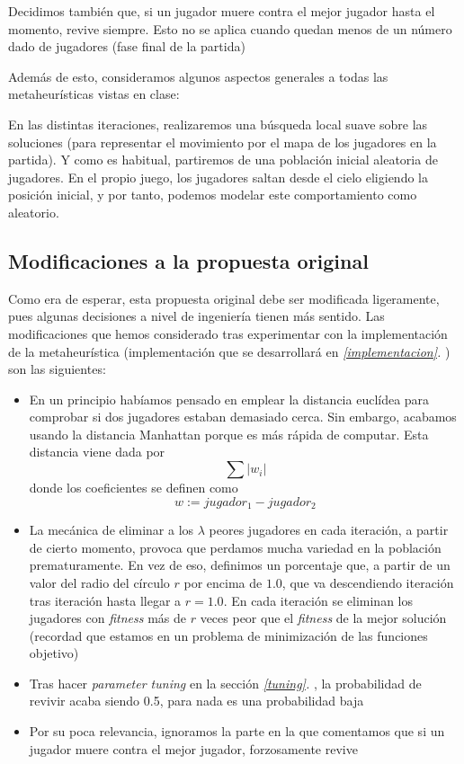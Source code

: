 \documentclass[11pt]{article}
\begin{document}
Decidimos también que, si un jugador muere contra el mejor jugador hasta el momento, revive siempre. Esto no se aplica cuando quedan menos de un número dado de jugadores (fase final de la partida)

Además de esto, consideramos algunos aspectos generales a todas las metaheurísticas vistas en clase:

En las distintas iteraciones, realizaremos una búsqueda local suave sobre las soluciones (para representar el movimiento por el mapa de los jugadores en la partida). Y como es habitual, partiremos de una población inicial aleatoria de jugadores. En el propio juego, los jugadores saltan desde el cielo eligiendo la posición inicial, y por tanto, podemos modelar este comportamiento como aleatorio.

\subsection{Modificaciones a la propuesta original}

Como era de esperar, esta propuesta original debe ser modificada ligeramente, pues algunas decisiones a nivel de ingeniería tienen más sentido. Las modificaciones que hemos considerado tras experimentar con la implementación de la metaheurística (implementación que se desarrollará en \emph{\ref{implementacion}. }) son las siguientes:

\begin{itemize}
    \item En un principio habíamos pensado en emplear la distancia euclídea para comprobar si dos jugadores estaban demasiado cerca. Sin embargo, acabamos usando la distancia Manhattan porque es más rápida de computar. Esta distancia viene dada por $$\sum |w_i|$$ donde los coeficientes se definen como $$w := jugador_1 - jugador_2$$
    \item La mecánica de eliminar a los $\lambda$ peores jugadores en cada iteración, a partir de cierto momento, provoca que perdamos mucha variedad en la población prematuramente. En vez de eso, definimos un porcentaje que, a partir de un valor del radio del círculo $r$ por encima de $1.0$, que va descendiendo iteración tras iteración hasta llegar a $r = 1.0$. En cada iteración se eliminan los jugadores con \emph{fitness} más de $r$ veces peor que el \emph{fitness} de la mejor solución (recordad que estamos en un problema de minimización de las funciones objetivo)
    \item Tras hacer \emph{parameter tuning} en la sección \emph{\ref{tuning}. }, la probabilidad de revivir acaba siendo 0.5, para nada es una probabilidad baja
    \item Por su poca relevancia, ignoramos la parte en la que comentamos que si un jugador muere contra el mejor jugador, forzosamente revive
\end{itemize}
\end{document}
